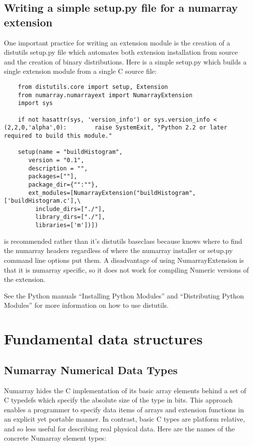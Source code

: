   \subsection{Writing a simple setup.py file for a numarray extension}
  One important practice for writing an extension module is the creation of a
  distutils setup.py file which automates both extension installation from
  source and the creation of binary distributions.  Here is a simple setup.py
  which builds a single extension module from a single C source file:
  \begin{verbatim}
    from distutils.core import setup, Extension
    from numarray.numarrayext import NumarrayExtension
    import sys
    
    if not hasattr(sys, 'version_info') or sys.version_info < (2,2,0,'alpha',0):        raise SystemExit, "Python 2.2 or later required to build this module."
    
    setup(name = "buildHistogram",
       version = "0.1",
       description = "",
       packages=[""],
       package_dir={"":""},
       ext_modules=[NumarrayExtension("buildHistogram",['buildHistogram.c'],\
         include_dirs=["./"],
         library_dirs=["./"],
         libraries=['m'])])
\end{verbatim}
 is recommended rather than it's distutils baseclass
\class{Extension} because \class{NumarrayExtension} knows where to find the
numarray headers regardless of where the numarray installer or setup.py command
line options put them.  A disadvantage of using NumarrayExtension is that it
is numarray specific, so it does not work for compiling Numeric versions of the
extension.

See the Python manuals ``Installing Python Modules'' and ``Distributing Python
Modules'' for more information on how to use distutils.

\section{Fundamental data structures}
\label{C-API:fundamental-data-structures}

\subsection{Numarray Numerical Data Types}

Numarray hides the C implementation of its basic array elements behind a set of
C typedefs which specify the absolute size of the type in bits.  This approach
enables a programmer to specify data items of arrays and extension functions in
an explicit yet portable manner.  In contrast, basic C types are platform
relative, and so less useful for describing real physical data.  Here are the
names of the concrete Numarray element types:

